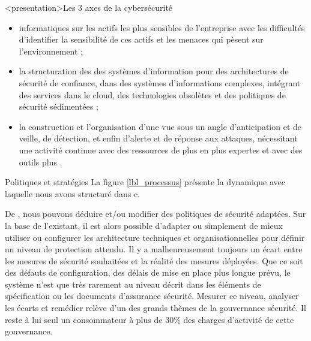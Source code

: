 \begin{frame}<presentation>{Les 3 axes de la cybersécurité}
	\begin{itemize}
 \item {} informatiques sur les actifs les plus sensibles de l'entreprise avec les difficultés d'identifier la sensibilité de ces actifs et les menaces qui pèsent sur l'environnement ;
\item la structuration des  des systèmes d'information pour des architectures de sécurité de confiance, dans des systèmes d'informations complexes, intégrant des services dans le cloud, des technologies obsolètes et des politiques de sécurité sédimentées ;
\item la construction et l’organisation d'une  vue sous un angle d'anticipation et de veille, de détection, et enfin d'alerte et de réponse aux attaques, nécessitant une activité continue avec des ressources de plus en plus expertes et avec des outils plus .
\end{itemize}
\end{frame}




\begin{frame}{Politiques et stratégies}	
La figure \ref{lbl_processus} présente la dynamique avec laquelle nous avons structuré dans c\edoc.
\end{frame}

De  , nous pouvons déduire et/ou modifier des politiques de sécurité adaptées. 
Sur la base de l’existant, il est alors possible d’adapter ou simplement de mieux utiliser ou configurer les architecture techniques et organisationnelles pour définir un niveau de protection attendu.
Il y a malheureusement toujours un écart entre les mesures de sécurité souhaitées et la réalité des mesures déployées. Que ce soit des défauts de configuration, des délais de mise en place plus longue prévu, le système n’est que très rarement au niveau décrit dans les éléments de spécification ou les documents d'assurance sécurité.
Mesurer ce niveau, analyser les écarts et remédier relève d’un des grands thèmes de la gouvernance sécurité. Il reste à lui seul un consommateur à plus de 30\% des charges d'activité de cette gouvernance.

